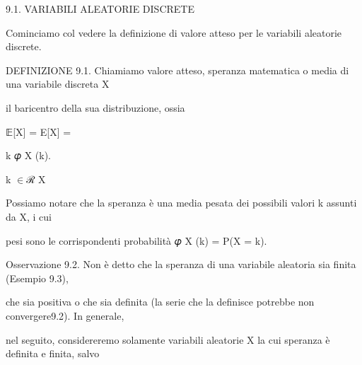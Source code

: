 \documentclass[a4paper,portrait,12pt]{article}
\begin{document}
\begin{flushleft}
9.1. VARIABILI ALEATORIE DISCRETE
\end{flushleft}


\begin{flushleft}
Cominciamo col vedere la definizione di valore atteso per le variabili aleatorie discrete.
\end{flushleft}


\begin{flushleft}
DEFINIZIONE 9.1. Chiamiamo valore atteso, speranza matematica o media di una variabile discreta X
\end{flushleft}


\begin{flushleft}
il baricentro della sua distribuzione, ossia
\end{flushleft}


\begin{flushleft}
𝔼[X] = E[X] =
\end{flushleft}





\begin{flushleft}
k 𝜑 X (k).
\end{flushleft}


\begin{flushleft}
k $\in$ℛ X
\end{flushleft}





\begin{flushleft}
Possiamo notare che la speranza \`{e} una media pesata dei possibili valori k assunti da X, i cui
\end{flushleft}


\begin{flushleft}
pesi sono le corrispondenti probabilit\`{a} 𝜑 X (k) = P(X = k).
\end{flushleft}


\begin{flushleft}
Osservazione 9.2. Non \`{e} detto che la speranza di una variabile aleatoria sia finita (Esempio 9.3),
\end{flushleft}


\begin{flushleft}
che sia positiva o che sia definita (la serie che la definisce potrebbe non convergere9.2). In generale,
\end{flushleft}


\begin{flushleft}
nel seguito, considereremo solamente variabili aleatorie X la cui speranza \`{e} definita e finita, salvo
\end{flushleft}
\end{document}
